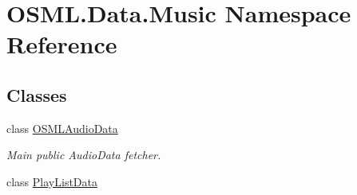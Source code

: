 \hypertarget{namespaceOSML_1_1Data_1_1Music}{}\section{O\+S\+M\+L.\+Data.\+Music Namespace Reference}
\label{namespaceOSML_1_1Data_1_1Music}
\subsection*{Classes}
\begin{DoxyCompactItemize}
\item 
class \mbox{\hyperlink{classOSML_1_1Data_1_1Music_1_1OSMLAudioData}{O\+S\+M\+L\+Audio\+Data}}
\begin{DoxyCompactList}\small\item\em Main public Audio\+Data fetcher. \end{DoxyCompactList}\item 
class \mbox{\hyperlink{classOSML_1_1Data_1_1Music_1_1PlayListData}{Play\+List\+Data}}
\end{DoxyCompactItemize}
